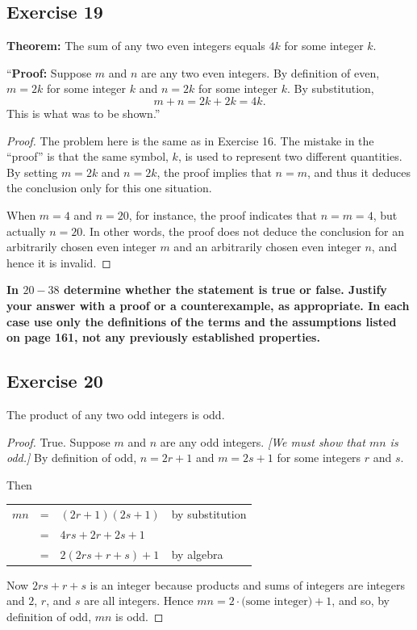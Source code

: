 \documentclass[14pt]{extarticle}
\newcommand{\cy}{\color{cyan}}
\begin{document}
\subsection{Exercise 19}
{\bf Theorem:} The sum of any two even integers equals $4k$ for some integer $k$.

“{\bf Proof:} Suppose $m$ and $n$ are any two even integers. By definition of even, $m = 2k$ for some integer $k$ and $n = 2k$ for some integer $k$. By substitution, 
\[
m + n = 2k + 2k = 4k.
\]
This is what was to be shown.”

\begin{proof}
The problem here is the same as in Exercise 16. The mistake in the “proof” is that the same symbol, $k$, is used to represent two different quantities. By setting $m = 2k$ and $n = 2k$, the proof implies that $n = m$, and thus it deduces the conclusion only for this one situation. 

When $m = 4$ and $n = 20$, for instance, the proof indicates that $n = m = 4$, but actually $n = 20$. In other words, the proof does not deduce the conclusion for an arbitrarily chosen even integer $m$ and an arbitrarily chosen even integer $n$, and hence it is invalid.
\end{proof}

{\bf \cy In $20-38$ determine whether the statement is true or false. Justify your answer with a proof or a counterexample, as appropriate. In each case use only the definitions of the terms and the assumptions listed on page 161, not any previously established properties.}

\subsection{Exercise 20}
The product of any two odd integers is odd.

\begin{proof}
True. Suppose $m$ and $n$ are any odd integers. {\it [We must show that $mn$ is odd.]} By definition of odd, $n = 2r + 1$ and $m = 2s + 1$ for some integers $r$ and $s$.

Then

\begin{center}
\begin{tabular}{rcll}
$mn$ & = & $(2r+1)(2s+1)$ & \cy by substitution \\
& = & $4rs + 2r + 2s + 1$ & \\
& = & $2(2rs + r + s) + 1$ & \cy by algebra \\
\end{tabular}
\end{center}

Now $2rs + r + s$ is an integer because products and sums
of integers are integers and $2$, $r$, and $s$ are all integers. Hence $mn = 2\cdot \text{(some integer)} + 1$, and so, by definition of odd, $mn$ is odd.
\end{proof}
\end{document}
